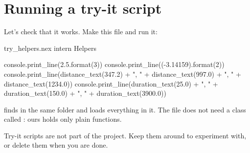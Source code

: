 \section{Running a try-it script}

Let's check that it works. Make this file and run it:

\begin{tryit}{try_helpers.nex}
intern Helpers

console.print_line(2.5.format(3))
console.print_line((-3.14159).format(2))
console.print_line(distance_text(347.2) + ", " + distance_text(997.0) + ", "
  + distance_text(1234.0))
console.print_line(duration_text(25.0) + ", " + duration_text(150.0) + ", "
  + duration_text(3900.0))
\end{tryit}

 finds  in the same folder and loads
everything in it. The file does not need a class called :
ours holds only plain functions.

Try-it scripts are not part of the project. Keep them around to experiment
with, or delete them when you are done.
